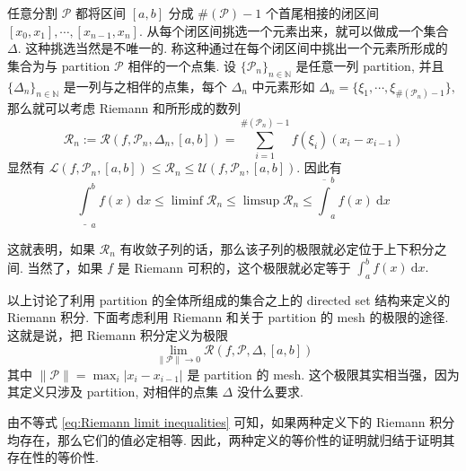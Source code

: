 \documentclass[12pt, a4paper, oneside]{book}
\numberwithin{figure}{section}
\theoremstyle{definition}
\begin{document}
任意分割 $\mathcal P$ 都将区间 $[a,b]$ 分成 $\#(\mathcal P)-1$ 个首尾相接的闭区间 $[x_0,x_1],\cdots,[x_{n-1},x_n].$ 从每个闭区间挑选一个元素出来，就可以做成一个集合 $\Delta.$ 这种挑选当然是不唯一的. 称这种通过在每个闭区间中挑出一个元素所形成的集合为与 partition $\mathcal P$ 相伴的一个点集. 
设 $\{\mathcal P_n\}_{n\in\mathbb N}$ 是任意一列 partition, 并且 $\{\Delta_n\}_{n\in\mathbb N}$ 是一列与之相伴的点集，每个 $\Delta_n$ 中元素形如 $\Delta_n=\{\xi_1,\cdots,\xi_{\#(\mathcal P_n)-1}\},$ 那么就可以考虑 Riemann 和所形成的数列
\begin{equation}
    \mathcal R_n:=\mathcal R(f,\mathcal P_n,\Delta_n,[a,b])=\sum_{i=1}^{\#(\mathcal P_n)-1} f(\xi_i)(x_{i}-x_{i-1})
\end{equation}
显然有 $\mathcal L(f,\mathcal P_n,[a,b])\leq \mathcal R_n\leq \mathcal U(f,\mathcal P_n,[a,b]).$ 因此有
\begin{equation}\label{eq:Riemann limit inequalities}
    \underline{\int}_a^b f(x)\ \mathrm dx\leq \liminf \mathcal R_n\leq \limsup \mathcal R_n\leq  \overline{\int}_a^b f(x)\ \mathrm dx
\end{equation}

这就表明，如果 $\mathcal R_n$ 有收敛子列的话，那么该子列的极限就必定位于上下积分之间.  当然了，如果 $f$ 是 Riemann 可积的，这个极限就必定等于 $\int_a^b f(x)\ \mathrm dx.$ 


以上讨论了利用 partition 的全体所组成的集合之上的 directed set 结构来定义的 Riemann 积分. 下面考虑利用 Riemann 和关于 partition 的 mesh 的极限的途径. 这就是说，把 Riemann 积分定义为极限
\begin{equation}\label{eq:Riemann_limit}
    \lim_{\|\mathcal P\|\to 0} \mathcal R(f,\mathcal P,\Delta,[a,b])
\end{equation}
其中 $\|\mathcal P\|=\max_{i}|x_{i}-x_{i-1}|$ 是 partition 的 mesh. 这个极限其实相当强，因为其定义只涉及 partition, 对相伴的点集 $\Delta$ 没什么要求.  

由不等式 \eqref{eq:Riemann limit inequalities} 可知，如果两种定义下的 Riemann 积分均存在，那么它们的值必定相等. 因此，两种定义的等价性的证明就归结于证明其存在性的等价性.
\end{document}
